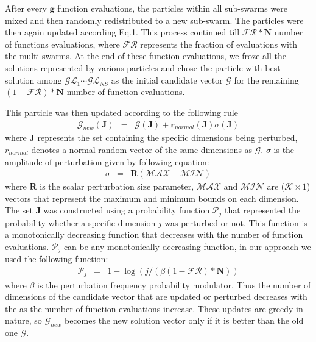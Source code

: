 \documentclass[12pt]{article}
\begin{document}
After every $\mathbf{g}$  function evaluations, the particles within all sub-swarms were mixed and then randomly redistributed to a new sub-swarm. The particles were then again updated according Eq.1. This process continued till $\mathcal{FR}*\mathbf{N}$ number of functions evaluations, where $\mathcal{FR}$ represents the fraction of evaluations with the multi-swarms. At the end of these function evaluations, we froze all the solutions represented by various particles and chose the particle with best solution among $\mathcal{GL}_{1} \cdots \mathcal{GL}_{NS}$ as the initial candidate vector $\mathcal{G}$ for the remaining $({1}-\mathcal{FR})*\mathbf{N}$ number of function evaluations.

This particle was then updated according to the following rule
\begin{eqnarray}
	\mathcal{G}_{new}(\mathbf{J})& = &\mathcal{G}(\mathbf{J})+\mathbf{r}_{normal}(\mathbf{J})\sigma(\mathbf{J})
\end{eqnarray}
where $\mathbf{J}$ represents the set containing the specific dimensions being perturbed, ${r}_{normal}$ denotes a normal random vector of the same dimensions as $\mathcal{G}$. $\sigma$ is the amplitude of perturbation given by following equation:
\begin{eqnarray}
	\sigma& = &\mathbf{R}(\mathcal{MAX} -\mathcal{MIN})
\end{eqnarray}
where $\mathbf{R}$ is the scalar perturbation size parameter, $\mathcal{MAX}$ and $\mathcal{MIN}$ are ($\mathcal{K}\times{1}$) vectors that represent the maximum and minimum bounds on each dimension. The set $\mathbf{J}$ was constructed using a probability function $\mathcal{P}_{j}$ that represented the probability whether a specific dimension $j$ was perturbed or not.  This function is a monotonically decreasing function that decreases with the number of function evaluations. $\mathcal{P}_{j}$ can be any monotonically decreasing function, in our approach we used the following function:
\begin{eqnarray}
	\mathcal{P}_{j}&=&{1}-\log(j/ (\beta({1}-\mathcal{FR})*\mathbf{N}))
\end{eqnarray}
where $\beta$ is the perturbation frequency probability modulator. Thus the number of dimensions of the candidate vector that are updated or perturbed decreases with the as the number of function evaluations increase. These updates are greedy in nature, so $\mathcal{G}_{new}$ becomes the new solution vector only if it is better than the old one $\mathcal{G}$. 
\end{document}
